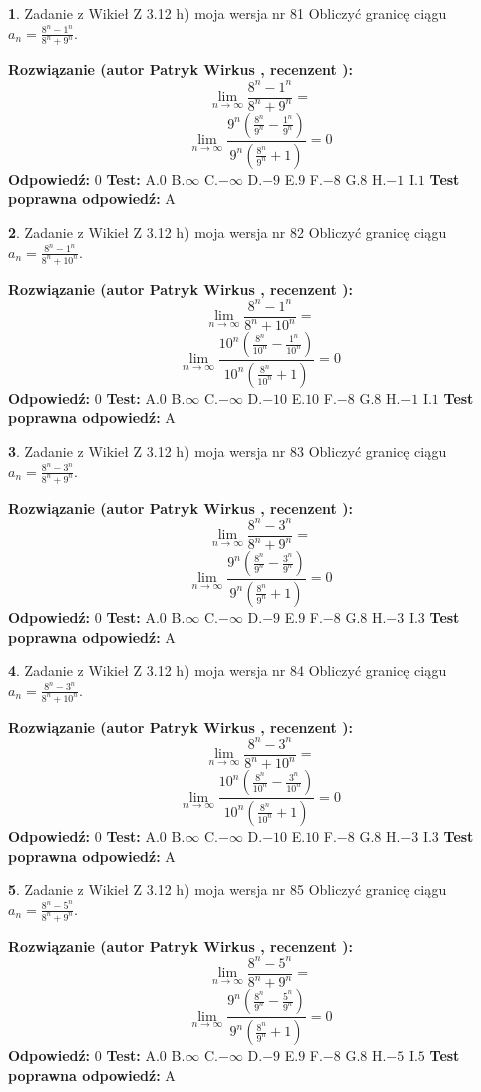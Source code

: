 \documentclass[12pt, a4paper]{article}
\theoremstyle{definition} %
\newtheorem{zad}{}
\newcommand{\zadStart}[1]{\begin{zad}#1\newline}
\newcommand{\zadStop}{\end{zad}}
\newcommand{\rozwStart}[2]{\noindent \textbf{Rozwiązanie (autor #1 , recenzent #2): }\newline}
\newcommand{\rozwStop}{\newline}
\newcommand{\odpStart}{\noindent \textbf{Odpowiedź:}\newline}
\newcommand{\odpStop}{\newline}
\newcommand{\testStart}{\noindent \textbf{Test:}\newline}
\newcommand{\testStop}{\newline}
\newcommand{\kluczStart}{\noindent \textbf{Test poprawna odpowiedź:}\newline}
\newcommand{\kluczStop}{\newline}
\begin{document}
\zadStart{Zadanie z Wikieł Z 3.12 h) moja wersja nr 81}
Obliczyć granicę ciągu $a_{n}=\frac{8^{n} - 1^{n}}{8^{n} + 9^{n}}$.
\zadStop
\rozwStart{Patryk Wirkus}{}
$$\lim\limits_{n\to\infty}\frac{8^{n} - 1^{n}}{8^{n} + 9^{n}}=$$
$$\lim\limits_{n\to\infty}\frac{9^{n}(\frac{8^{n}}{9^{n}} - \frac{1^{n}}{9^{n}})}{9^{n}(\frac{8^{n}}{9^{n}} + 1)} = 0$$
\rozwStop
\odpStart
$0$
\odpStop
\testStart
A.$0$
B.$\infty$
C.$-\infty$
D.$-9$
E.$9$
F.$-8$
G.$8$
H.$-1$
I.$1$
\testStop
\kluczStart
A
\kluczStop



\zadStart{Zadanie z Wikieł Z 3.12 h) moja wersja nr 82}
Obliczyć granicę ciągu $a_{n}=\frac{8^{n} - 1^{n}}{8^{n} + 10^{n}}$.
\zadStop
\rozwStart{Patryk Wirkus}{}
$$\lim\limits_{n\to\infty}\frac{8^{n} - 1^{n}}{8^{n} + 10^{n}}=$$
$$\lim\limits_{n\to\infty}\frac{10^{n}(\frac{8^{n}}{10^{n}} - \frac{1^{n}}{10^{n}})}{10^{n}(\frac{8^{n}}{10^{n}} + 1)} = 0$$
\rozwStop
\odpStart
$0$
\odpStop
\testStart
A.$0$
B.$\infty$
C.$-\infty$
D.$-10$
E.$10$
F.$-8$
G.$8$
H.$-1$
I.$1$
\testStop
\kluczStart
A
\kluczStop



\zadStart{Zadanie z Wikieł Z 3.12 h) moja wersja nr 83}
Obliczyć granicę ciągu $a_{n}=\frac{8^{n} - 3^{n}}{8^{n} + 9^{n}}$.
\zadStop
\rozwStart{Patryk Wirkus}{}
$$\lim\limits_{n\to\infty}\frac{8^{n} - 3^{n}}{8^{n} + 9^{n}}=$$
$$\lim\limits_{n\to\infty}\frac{9^{n}(\frac{8^{n}}{9^{n}} - \frac{3^{n}}{9^{n}})}{9^{n}(\frac{8^{n}}{9^{n}} + 1)} = 0$$
\rozwStop
\odpStart
$0$
\odpStop
\testStart
A.$0$
B.$\infty$
C.$-\infty$
D.$-9$
E.$9$
F.$-8$
G.$8$
H.$-3$
I.$3$
\testStop
\kluczStart
A
\kluczStop



\zadStart{Zadanie z Wikieł Z 3.12 h) moja wersja nr 84}
Obliczyć granicę ciągu $a_{n}=\frac{8^{n} - 3^{n}}{8^{n} + 10^{n}}$.
\zadStop
\rozwStart{Patryk Wirkus}{}
$$\lim\limits_{n\to\infty}\frac{8^{n} - 3^{n}}{8^{n} + 10^{n}}=$$
$$\lim\limits_{n\to\infty}\frac{10^{n}(\frac{8^{n}}{10^{n}} - \frac{3^{n}}{10^{n}})}{10^{n}(\frac{8^{n}}{10^{n}} + 1)} = 0$$
\rozwStop
\odpStart
$0$
\odpStop
\testStart
A.$0$
B.$\infty$
C.$-\infty$
D.$-10$
E.$10$
F.$-8$
G.$8$
H.$-3$
I.$3$
\testStop
\kluczStart
A
\kluczStop



\zadStart{Zadanie z Wikieł Z 3.12 h) moja wersja nr 85}
Obliczyć granicę ciągu $a_{n}=\frac{8^{n} - 5^{n}}{8^{n} + 9^{n}}$.
\zadStop
\rozwStart{Patryk Wirkus}{}
$$\lim\limits_{n\to\infty}\frac{8^{n} - 5^{n}}{8^{n} + 9^{n}}=$$
$$\lim\limits_{n\to\infty}\frac{9^{n}(\frac{8^{n}}{9^{n}} - \frac{5^{n}}{9^{n}})}{9^{n}(\frac{8^{n}}{9^{n}} + 1)} = 0$$
\rozwStop
\odpStart
$0$
\odpStop
\testStart
A.$0$
B.$\infty$
C.$-\infty$
D.$-9$
E.$9$
F.$-8$
G.$8$
H.$-5$
I.$5$
\testStop
\kluczStart
A
\kluczStop
\end{document}
